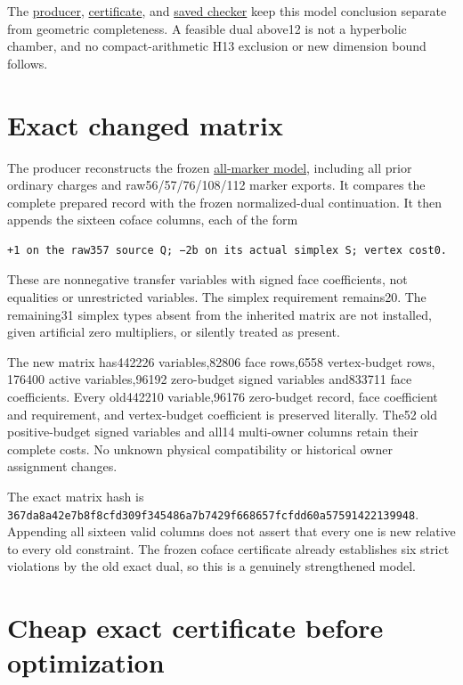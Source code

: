 \documentclass[
  10pt,
]{report}
\begin{document}
The
\href{../scripts/fresh_raw357_coface_full_model_20261018.py}{producer},
\href{fresh_raw357_coface_full_model_20261018.json}{certificate}, and
\href{../scripts/check_raw357_coface_full_model_saved_20261018.py}{saved
checker} keep this model conclusion separate from geometric
completeness. A feasible dual above12 is not a hyperbolic chamber, and
no compact-arithmetic H13 exclusion or new dimension bound follows.

\section{Exact changed matrix}\label{exact-changed-matrix}

The producer reconstructs the frozen
\href{fresh_all_marker_families_full_model_20261018.md}{all-marker
model}, including all prior ordinary charges and raw56/57/76/108/112
marker exports. It compares the complete prepared record with the frozen
normalized-dual continuation. It then appends the sixteen coface
columns, each of the form

\begin{verbatim}
+1 on the raw357 source Q; −2b on its actual simplex S; vertex cost0.
\end{verbatim}

These are nonnegative transfer variables with signed face coefficients,
not equalities or unrestricted variables. The simplex requirement
remains20. The remaining31 simplex types absent from the inherited
matrix are not installed, given artificial zero multipliers, or silently
treated as present.

The new matrix has442226 variables,82806 face rows,6558 vertex-budget
rows, 176400 active variables,96192 zero-budget signed variables
and833711 face coefficients. Every old442210 variable,96176 zero-budget
record, face coefficient and requirement, and vertex-budget coefficient
is preserved literally. The52 old positive-budget signed variables and
all14 multi-owner columns retain their complete costs. No unknown
physical compatibility or historical owner assignment changes.

The exact matrix hash is
\nolinkurl{367da8a42e7b8f8cfd309f345486a7b7429f668657fcfdd60a57591422139948}.
Appending all sixteen valid columns does not assert that every one is
new relative to every old constraint. The frozen coface certificate
already establishes six strict violations by the old exact dual, so this
is a genuinely strengthened model.

\section{Cheap exact certificate before
optimization}\label{cheap-exact-certificate-before-optimization}
\end{document}
